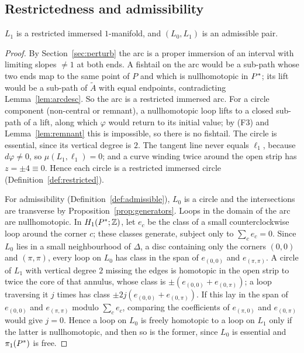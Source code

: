 \subsection{Restrictedness and admissibility}\label{ss:unobstructed}

\begin{lemma}\label{lem:unobstructed}
$L_1$ is a restricted immersed $1$-manifold, and $(L_0,L_1)$ is an admissible pair.
\end{lemma}

\begin{proof}
By Section~\ref{sec:perturb} the arc is a proper immersion of an interval with limiting slopes $\neq1$ at both
ends. A fishtail on the arc would be a sub-path whose two ends map to the same point of $P$ and which is
nullhomotopic in $P^{*}$; its lift would be a sub-path of $\tilde A$ with equal endpoints, contradicting
Lemma~\ref{lem:arcdesc}. So the arc is a restricted immersed arc. For a circle component (non-central or
remnant), a nullhomotopic loop lifts to a closed sub-path of a lift, along which $\varphi$ would return to its
initial value; by (F3) and Lemma~\ref{lem:remnant} this is impossible, so there is no fishtail. The circle is
essential, since its vertical degree is $2$. The tangent line never equals $\ell_1$, because $d\varphi\neq0$, so
$\mu(L_1,\ell_1)=0$; and a curve winding twice around the open strip has $z=\pm4\equiv0$. Hence each circle is a
restricted immersed circle (Definition~\ref{def:restricted}).

For admissibility (Definition~\ref{def:admissible}), $L_0$ is a circle and the intersections are transverse
by Proposition~\ref{prop:generators}. Loops in the domain of the arc are nullhomotopic. In $H_1(P^{*};\mathbb{Z})$, let
$e_c$ be the class of a small counterclockwise loop around the corner $c$; these classes generate, subject only
to $\sum_ce_c=0$. Since $L_0$ lies in a small neighbourhood of $\Delta$, a disc containing only the corners $(0,0)$
and $(\pi,\pi)$, every loop on $L_0$ has class in the span of $e_{(0,0)}$ and $e_{(\pi,\pi)}$. A circle of $L_1$ with vertical
degree $2$ missing the edges is homotopic in the open strip to twice the core of that annulus, whose class is
$\pm(e_{(0,0)}+e_{(0,\pi)})$; a loop traversing it $j$ times has class $\pm2j(e_{(0,0)}+e_{(0,\pi)})$. If this lay in the span of
$e_{(0,0)}$ and $e_{(\pi,\pi)}$ modulo $\sum_ce_c$, comparing the coefficients of $e_{(\pi,0)}$ and $e_{(0,\pi)}$ would give
$j=0$. Hence a loop on $L_0$ is freely homotopic to a loop on $L_1$ only if the latter is nullhomotopic, and then
so is the former, since $L_0$ is essential and $\pi_1(P^{*})$ is free.
\end{proof}

